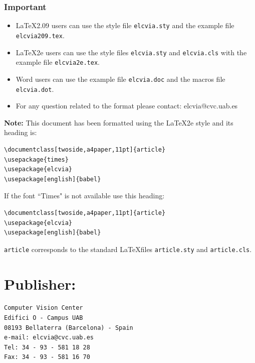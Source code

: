 \documentclass[twoside,a4paper,11pt]{article}
\begin{document}
 
\subsubsection{Important}

\begin{itemize}

\item
      \LaTeX 2.09 users can use the style file
      {\tt elcvia.sty} and the example file {\tt elcvia209.tex}.

\item
      \LaTeX 2e users can use the style files
      {\tt elcvia.sty} and {\tt elcvia.cls} with the example file
      {\tt elcvia2e.tex}.

\item
     Word users can use the example file 
     {\tt elcvia.doc} and the macros file
     {\tt elcvia.dot}.

\item For any question related to the format please contact: {\sf elcvia@cvc.uab.es}

\end{itemize}

\noindent
{\Large \bf Note:}
This document has been formatted using the \LaTeX 2e style \cite{Les:94}
and its heading is:

\begin{verbatim}
\documentclass[twoside,a4paper,11pt]{article}
\usepackage{times}
\usepackage{elcvia}
\usepackage[english]{babel}
\end{verbatim}

If the font ``Times" is not available use this heading:

\begin{verbatim}
\documentclass[twoside,a4paper,11pt]{article}
\usepackage{elcvia}
\usepackage[english]{babel}
\end{verbatim}

{\tt article} corresponds to the standard \LaTeX files {\tt article.sty} and
{\tt article.cls}.

\section{Publisher:}

\begin{verbatim}
Computer Vision Center
Edifici O - Campus UAB
08193 Bellaterra (Barcelona) - Spain
e-mail: elcvia@cvc.uab.es
Tel: 34 - 93 - 581 18 28
Fax: 34 - 93 - 581 16 70
\end{verbatim}
\end{document}
